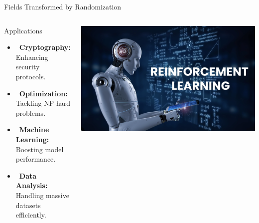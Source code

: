 \documentclass{beamer}
\begin{document}
\begin{frame}{Fields Transformed by Randomization}
    \begin{columns}
        \begin{block}{Applications}
            \begin{itemize}
                \item<1-> \faLock \ \textbf{Cryptography:} Enhancing security protocols.
                \item<2-> \faChartLine \ \textbf{Optimization:} Tackling NP-hard problems.
                \item<3-> \faRobot \ \textbf{Machine Learning:} Boosting model performance.
                \item<4-> \faDatabase \ \textbf{Data Analysis:} Handling massive datasets efficiently.
            \end{itemize}
        \end{block}
        \centering
        \includegraphics[width=\linewidth]{ml.png}
    \end{columns}
\end{frame}
\end{document}
